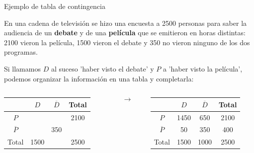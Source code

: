 \documentclass[11pt,handout]{beamer}
\begin{document}
\begin{frame}{Ejemplo de tabla de contingencia}

\begin{block}{}
En una cadena de televisión se hizo una encuesta a 2500 personas para saber la audiencia de un \textbf{debate} y de una \textbf{película} que se emitieron en horas distintas: 2100 vieron la película, 1500 vieron el debate y 350 no
vieron ninguno de los dos programas.
\end{block}

Si llamamos $D$ al suceso 'haber visto el debate'  y $P$ a 'haber visto la película', podemos organizar la información en una tabla y completarla: 
\newline

\pause

\begin{columns}
\begin{column}{0.41\textwidth}  
     \begin{tabular}{|c | c | c | c |} 
     \hline
       &  $D$ & $\overline{D}$ & Total \\ [0.5ex] 
     \hline
     $P$ &  &  & 2100 \\ 
     \hline
     $\overline{P}$ &  & 350 &  \\
     \hline
     Total & 1500 &  &  2500 \\
     \hline
    \end{tabular}
\end{column}
\begin{column}{0.05\textwidth}
  $$\to$$  
\end{column}
\begin{column}{0.41\textwidth}
\pause
     \begin{tabular}{|c | c | c | c |} 
     \hline
      &  $D$ & $\overline{D}$ & Total \\ [0.5ex] 
     \hline
     $P$ & \color{red}1450 & \color{red}650 & 2100 \\ 
     \hline
     $\overline{P}$ & \color{red}50  & 350 & \color{red}400 \\
     \hline
     Total & 1500 & \color{red}1000 &  2500 \\
     \hline
    \end{tabular}
\end{column}
\end{columns}
\end{frame}
\end{document}
